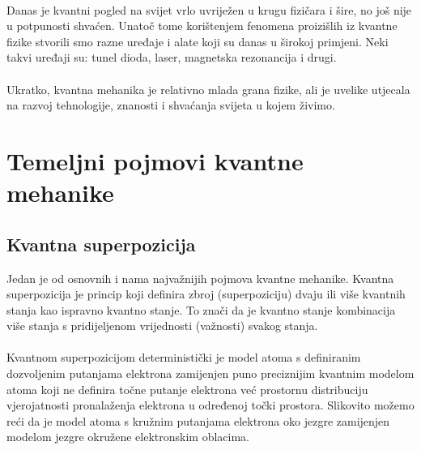 \documentclass[times, utf8, zavrsni, numeric]{fer}
\begin{document}
\paragraph{}
Danas je kvantni pogled na svijet vrlo uvriježen u krugu fizičara i šire, no još nije u potpunosti shvaćen. Unatoč tome korištenjem fenomena proizišlih iz kvantne fizike stvorili smo razne uređaje i alate koji su danas u širokoj primjeni. Neki takvi uređaji su: tunel dioda, laser, magnetska rezonancija i drugi.

\paragraph{}
Ukratko, kvantna mehanika je relativno mlada grana fizike, ali je uvelike utjecala na razvoj tehnologije, znanosti i shvaćanja svijeta u kojem živimo.

\section{Temeljni pojmovi kvantne mehanike}

\subsection{Kvantna superpozicija}
Jedan je od osnovnih i nama najvažnijih pojmova kvantne mehanike.
Kvantna superpozicija je princip koji definira zbroj (superpoziciju) dvaju ili više kvantnih stanja kao ispravno kvantno stanje. 
To znači da je kvantno stanje kombinacija više stanja s pridijeljenom vrijednosti (važnosti) svakog stanja.

\paragraph{}
Kvantnom superpozicijom deterministički je model atoma s definiranim dozvoljenim putanjama elektrona zamijenjen puno preciznijim kvantnim modelom atoma koji ne definira točne putanje elektrona već prostornu distribuciju vjerojatnosti pronalaženja elektrona u određenoj točki prostora. Slikovito možemo reći da je model atoma s kružnim putanjama elektrona oko jezgre zamijenjen modelom jezgre okružene elektronskim oblacima. \citep{bozja_cestica}
\end{document}
